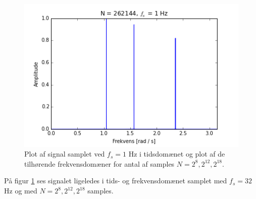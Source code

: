 \begin{figure}[H]
\begin{minipage}{0.49\textwidth}
\includegraphics[width=\textwidth]{figures/frekvensanalyse/freq_1hz_N262144.png}
\end{minipage}
\caption{Plot af signal samplet ved $f_s=1$ Hz i tidsdomænet og plot af de tilhørende frekvensdomæner for antal af samples $N = 2^8, 2^{12}, 2^{18}$.}
\label{fig:1}
\end{figure}

På figur \ref{fig:1} ses signalet ligeledes i tids- og frekvensdomænet samplet med $f_s=32$ Hz og med $N=2^8, 2^{12}, 2^{18}$ samples.

